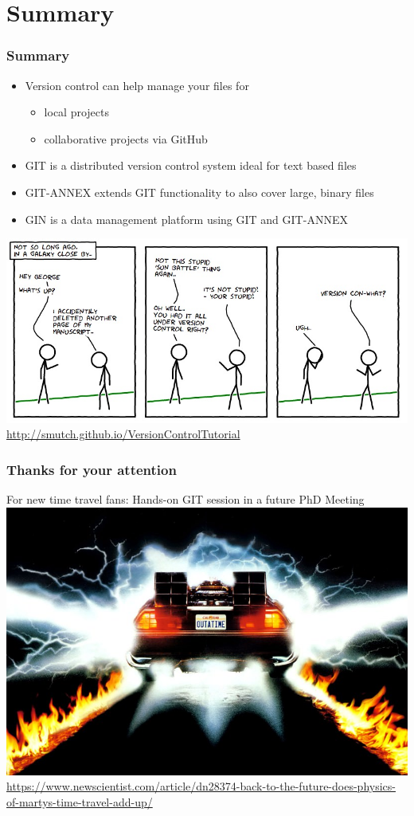 \documentclass[
t, %
10pt, %
aspectratio=1610, %
ngerman,
english,
]{beamer}
\begin{document}
\section{Summary}

\begin{frame}
    \frametitle{Summary}
    \begin{itemize}
	\item Version control can help manage your files for
	\begin{itemize}
	    \item local projects
	    \item collaborative projects via GitHub
	\end{itemize}
	\item GIT is a distributed version control system ideal for text based files
	\item GIT-ANNEX extends GIT functionality to also cover large, binary files
	\item GIN is a data management platform using GIT and GIT-ANNEX
    \end{itemize}
    \centering
    \includegraphics[height=0.55\textheight]{graphics/vc-xkcd.jpg}
    \url{http://smutch.github.io/VersionControlTutorial}
\end{frame}


\begin{frame}
    \frametitle{Thanks for your attention}
    For new time travel fans: Hands-on GIT session in a future PhD Meeting
    \centering
    \includegraphics[height=0.7\textheight]{graphics/dn28374-1_800.jpg}\\
    \tiny{\url{https://www.newscientist.com/article/dn28374-back-to-the-future-does-physics-of-martys-time-travel-add-up/}}
\end{frame}
\end{document}
